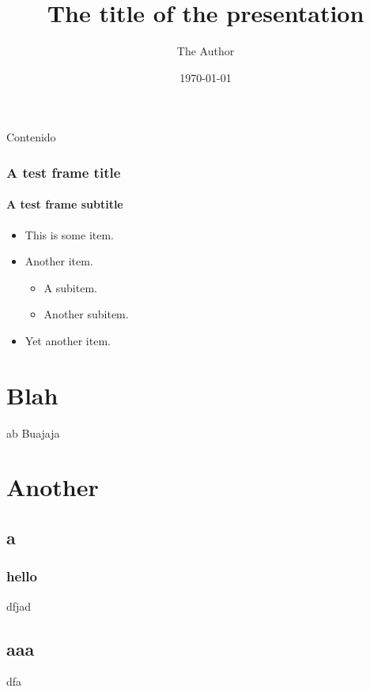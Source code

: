 \documentclass{beamer}
\title[The short title]{The title of the presentation}
\author{The Author}
\date{\today}
\begin{document}
\begin{frame}[plain]
\maketitle
\end{frame}

\begin{frame}{Contenido}
  \tableofcontents
\end{frame}

\begin{frame}
  \frametitle{A test frame title}
  \framesubtitle{A test frame subtitle}
  \begin{itemize}
    \item This is some item.
    \item Another item.
    \begin{itemize}
      \item A subitem.
      \item Another subitem.
    \end{itemize}
    \item Yet another item.
  \end{itemize}

\end{frame}

\section{Blah}

\begin{frame}{a}{b}
  Buajaja

\end{frame}

\section{Another}
\subsection{a}
\begin{frame}
  \frametitle{hello}

  dfjad
  \subsection{aaa}
  dfa
\end{frame}
\end{document}
